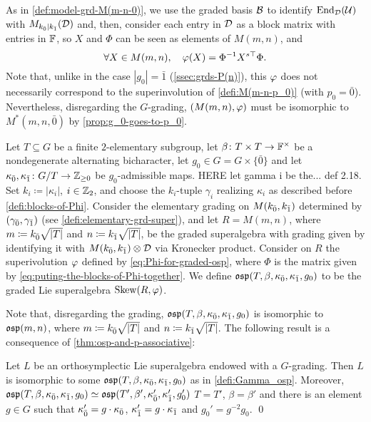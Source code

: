 As in \cref{def:model-grd-M(m-n-0)}, we use the graded basis $\mathcal B$ to identify $\operatorname{End}_{\mathcal{D}}(\mathcal U)$ with $M_{k_{\bar{0}}|k_{\bar{1}}}(\mathcal{D})$ and, then, consider each entry in $\mathcal{D}$ as a block matrix with entries in $\mathbb{F}$, so $X$ and $\Phi$ can be seen as elements of $M(m,n)$, and
\[\label{eq:Phi-for-graded-osp}
    \forall X\in M(m,n), \quad \varphi(X) = \Phi^{-1} X^{s\top} \Phi.
\]
Note that, unlike in the case $|g_0| = \bar 1$ (\cref{ssec:grds-P(n)}), this $\varphi$ does not necessarily correspond to the superinvolution of \cref{defi:M(m-n-p_0)} (with $p_0 = \bar 0$). 
Nevertheless, disregarding the $G$-grading, $(M(m,n), \varphi)$ must be isomorphic to $M^*(m,n, \bar 0)$ by \cref{prop:g_0-goes-to-p_0}.

\begin{defi}\label{defi:Gamma_osp}
    Let $T \subseteq G$ be a finite $2$-elementary subgroup, let $\beta\colon {T\times T} \to \mathbb{F}^\times$ be a nondegenerate alternating bicharacter, let $g_0 \in G = G\times \{ \bar 0 \}$ and let $\kappa_{\bar{0}}, \kappa_{\bar{1}} \colon G/T \to \mathbb{Z}_{\geq 0}$ be $g_0$-admissible maps. 
    HERE let gamma i be the... def 2.18.
    Set $k_i \coloneqq |\kappa_i|$, $i\in \mathbb{Z}_2$, and choose the $k_i$-tuple $\gamma_i$ realizing $\kappa_i$ as described before \cref{defi:blocks-of-Phi}. 
    Consider the elementary grading on $M(k_{\bar{0}}, k_{\bar{1}})$ determined by $(\gamma_{\bar{0}}, \gamma_{\bar{1}})$ (see \cref{defi:elementary-grd-super}), and let $R = M(m,n)$, where $m \coloneqq k_{\bar{0}} \sqrt{|T|}$ and $n \coloneqq k_{\bar{1}} \sqrt{|T|}$, be the graded superalgebra with grading given by identifying it with $M(k_{\bar{0}}, k_{\bar{1}}) \otimes \mathcal{D}$ via Kronecker product. 
    Consider on $R$ the superivolution $\varphi$ defined by \cref{eq:Phi-for-graded-osp}, where $\Phi$ is the matrix given by \cref{eq:puting-the-blocks-of-Phi-together}. 
    We define $\mathfrak{osp}(T, \beta, \kappa_{\bar{0}}, \kappa_{\bar{1}}, g_0)$ to be the graded Lie superalgebra $\operatorname{Skew}(R, \varphi)$. 
\end{defi}

Note that, disregarding the grading, $\mathfrak{osp}(T, \beta, \kappa_{\bar{0}}, \kappa_{\bar{1}}, g_0)$ is isomorphic to $\mathfrak{osp}(m,n)$, where $m \coloneqq k_{\bar{0}} \sqrt{|T|}$ and $n \coloneqq k_{\bar{1}} \sqrt{|T|}$.
The following result is a consequence of \cref{thm:osp-and-p-associative}:

\begin{thm}\label{thm:grds-osp-final}
    Let $L$ be an orthosymplectic Lie superalgebra endowed with a $G$-grading. 
    Then $L$ is isomorphic to some $\mathfrak{osp}(T, \beta, \kappa_{\bar{0}}, \kappa_{\bar{1}}, g_0)$ as in \cref{defi:Gamma_osp}. 
    Moreover, $\mathfrak{osp}(T, \beta, \kappa_{\bar{0}}, \kappa_{\bar{1}}, g_0) \simeq \mathfrak{osp}(T', \beta', \kappa_{\bar{0}}', \kappa_{\bar{1}}', g_0')$ \IFF $T =T'$, $\beta = \beta'$ and there is an element $g \in G$ such that $\kappa_{\bar{0}}' = g\cdot\kappa_{\bar{0}}$, $\kappa_{\bar{1}}' = g\cdot\kappa_{\bar{1}}$ and $g_0' = g^{-2}g_0$. \qed
\end{thm}

